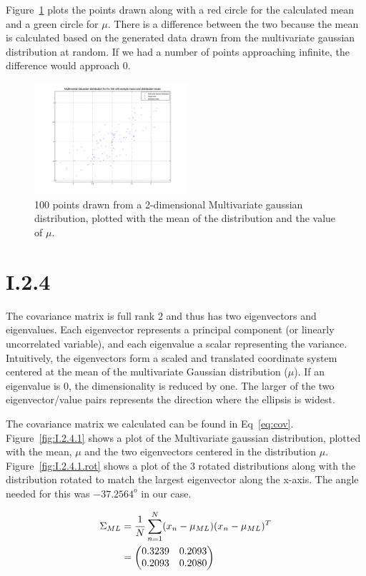 Figure~\ref{fig:I.2.3} plots the points drawn along with a red circle for the calculated mean and a green circle
for $\mu$. There is a difference between the two because the mean is calculated based on the generated data drawn
from the multivariate gaussian distribution at random. If we had a number of points approaching infinite, the difference
would approach 0.

\begin{figure}[h!]
	\includegraphics[width=0.5\textwidth]{img/multigaussmeanxy}
	\caption{100 points drawn from a 2-dimensional Multivariate gaussian distribution, plotted with
	the mean of the distribution and the value of $\mu$. \label{fig:I.2.3}}
\end{figure}

\FloatBarrier
\section*{I.2.4}
The covariance matrix is full rank 2 and thus has two eigenvectors and eigenvalues. Each eigenvector represents
a principal component (or linearly uncorrelated variable), and each eigenvalue a scalar representing the variance.
Intuitively, the eigenvectors form a scaled and translated coordinate system centered at the mean of the multivariate
Gaussian distribution ($\mu$). If an eigenvalue is 0, the dimensionality is reduced by one. The larger of the two
eigenvector/value pairs represents the direction where the ellipsis is widest.

The covariance matrix we calculated can be found in Eq~\ref{eq:cov}. Figure~\ref{fig:I.2.4.1} shows a plot of the Multivariate
gaussian distribution, plotted with the mean, $\mu$ and the two eigenvectors centered in the distribution $\mu$. Figure~\ref{fig:I.2.4.1.rot}
shows a plot of the 3 rotated distributions along with the distribution rotated to match the largest eigenvector along the x-axis. The
angle needed for this was $-37.2564^o$ in our case.

\begin{align}
	\Sigma_{ML} &= \frac{1}{N} \sum_{n=1}^N (x_n - \mu_{ML}) (x_n - \mu_{ML})^T \notag \\
	&= \begin{pmatrix}
		0.3239 & 0.2093 \\
		0.2093 & 0.2080
	\end{pmatrix} \label{eq:cov}
\end{align}

